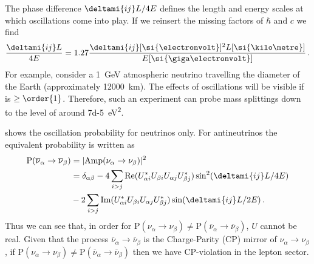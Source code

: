 The phase difference $\deltami{ij}L/4E$ defines the length and energy scales at which oscillations come into play.
If we reinsert the missing factors of $\hbar$ and $c$ we find
\begin{equation}
  \frac{ \deltami{ij} L }{ 4E } = 1.27 \frac{ \deltami{ij} [\si{\electronvolt}]^{2} L [\si{\kilo\metre}]}{ E [\si{\giga\electronvolt}] } \, .
  \label{eq:phaseDiffM2}
\end{equation}
For example, consider a \SI{1}{\giga\electronvolt} atmospheric neutrino travelling the diameter of the Earth (approximately \SI{12000}{\kilo\metre}).
The effects of oscillations will be visible if  is $\geq \order{1}$.
Therefore, such an experiment can probe mass splittings down to the level of around \SI{7d-5}{\electronvolt\squared}.

 shows the oscillation probability for neutrinos only.
For antineutrinos the equivalent probability is written as
\begin{align}
\begin{split}
  \text{P}(\overline{\nu}_{\alpha} \rightarrow \overline{\nu}_{\beta}) &= | \text{Amp}(\nu_{\alpha} \rightarrow \nu_{\beta}) |^{2} \\
  &= \delta_{\alpha \beta} - 4 \sum_{i > j} \text{Re}( U^{*}_{\alpha i} U_{\beta i} U_{\alpha j} U^{*}_{\beta j} ) \sin^{2}(\deltami{ij}L/4E) \\
  & - 2 \sum_{i>j} \text{Im}( U^{*}_{\alpha i} U_{\beta i} U_{\alpha j} U^{*}_{\beta j} ) \sin (\deltami{ij}L/2E) \, .
\end{split}
\end{align}
Thus we can see that, in order for $\text{P}(\nu_{\alpha} \rightarrow \nu_{\beta}) \neq \text{P}(\overline{\nu}_{\alpha} \rightarrow \overline{\nu}_{\beta})$, $U$ cannot be real.
Given that the process $\overline{\nu}_{\alpha} \rightarrow \overline{\nu}_{\beta}$ is the Charge-Parity (CP) mirror of $\nu_{\alpha} \rightarrow \nu_{\beta}$, if $\text{P}(\nu_{\alpha} \rightarrow \nu_{\beta}) \neq \text{P}(\overline{\nu}_{\alpha} \rightarrow \overline{\nu}_{\beta})$ then we have CP-violation in the lepton sector.

